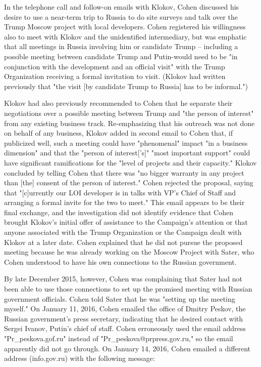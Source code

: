In the telephone call and follow-on emails with Klokov, Cohen discussed his desire to use a near-term trip to Russia to do site surveys and talk over the Trump Moscow project with local developers.
Cohen registered his willingness also to meet with Klokov and the unidentified intermediary, but was emphatic that all meetings in Russia involving him or candidate Trump -- including a possible meeting between candidate Trump and Putin-would need to be "in conjunction with the development and an official visit" with the Trump Organization receiving a formal invitation to visit.
(Klokov had written previously that "the visit [by candidate Trump to Russia] has to be informal.")

Klokov had also previously recommended to Cohen that he separate their negotiations over a possible meeting between Trump and "the person of interest" from any existing business track.
Re-emphasizing that his outreach was not done on behalf of any business, Klokov added in second email to Cohen that, if publicized well, such a meeting could have "phenomenal" impact "in a business dimension" and that the "person of interest['s]" "most important support" could have significant ramifications for the "level of projects and their capacity."
Klokov concluded by telling Cohen that there was "no bigger warranty in any project than [the] consent of the person of interest."
Cohen rejected the proposal, saying that "[c]urrently our LOI developer is in talks with VP's Chief of Staff and arranging a formal invite for the two to meet."
This email appears to be their final exchange, and the investigation did not identify evidence that Cohen brought Klokov's initial offer of assistance to the Campaign's attention or that anyone associated with the Trump Organization or the Campaign dealt with Klokov at a later date.
Cohen explained that he did not pursue the proposed meeting because he was already working on the Moscow Project with Sater, who Cohen understood to have his own connections to the Russian government.

By late December 2015, however, Cohen was complaining that Sater had not been able to use those connections to set up the promised meeting with Russian government officials.
Cohen told Sater that he was "setting up the meeting myself."%
On January 11, 2016, Cohen emailed the office of Dmitry Peskov, the Russian government's press secretary, indicating that he desired contact with Sergei Ivanov, Putin's chief of staff.
Cohen erroneously used the email address "Pr\_peskova\@prpress.gof.ru" instead of "Pr\_peskova@prpress.gov.ru," so the email apparently did not go through.%
On January 14, 2016, Cohen emailed a different address (info\@prpress.gov.ru) with the following message:


